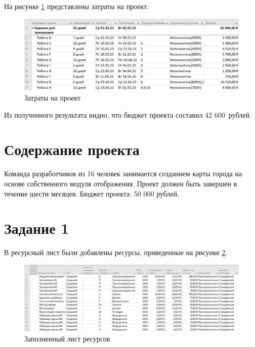 На рисунке \ref{img:task0-budget} представлены затраты на проект.

\begin{figure}[H]
	\begin{center}
		\includegraphics[scale=0.45]{inc/img/task0-budget.jpg}
	\end{center}
	\captionsetup{justification=centering}
	\caption{Затраты на проект}
	\label{img:task0-budget}
\end{figure}

Из полученного результата видно, что бюджет проекта составил 42 600~рублей.

\section*{Содержание проекта}

Команда разработчиков из 16 человек занимается созданием карты города на основе собственного модуля отображения. Проект должен быть завершен в течение шести месяцев. Бюджет проекта: 50 000 рублей.

\section*{Задание 1}

В ресурсный лист были добавлены ресурсы, приведенные на рисунке \ref{img:task1-list}.

\begin{figure}[H]
	\begin{center}
		\includegraphics[scale=0.45]{inc/img/task1-list.jpg}
	\end{center}
	\captionsetup{justification=centering}
	\caption{Заполненный лист ресурсов}
	\label{img:task1-list}
\end{figure}

